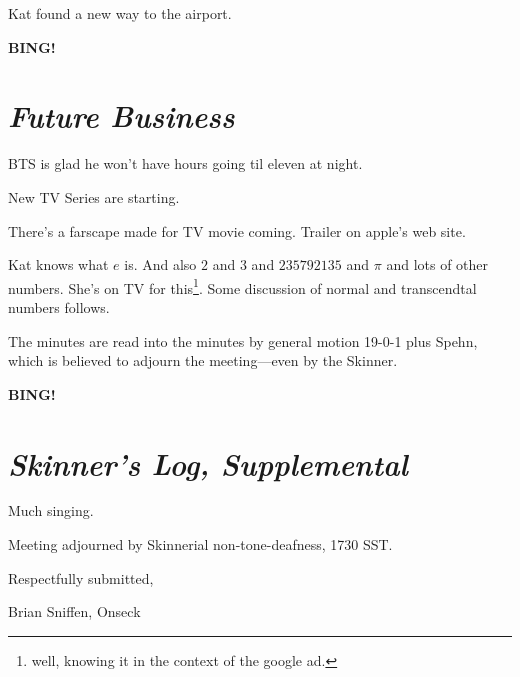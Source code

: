 \documentclass[10pt]{article}
\newcommand{\bing}{{\bf BING!} }
\newcommand{\goto}[1]{\bing \vskip 12pt \section*{{\em{#1}}}}
\newcommand{\ps}{ plus Spehn\xspace}
\begin{document}
Kat found a new way to the airport.

\goto{Future Business}

BTS is glad he won't have hours going til eleven at night.

New TV Series are starting.

There's a farscape made for TV movie coming.  Trailer on apple's web
site.

Kat knows what $e$ is.  And also $2$ and $3$ and $235792135$ and $\pi$
and lots of other numbers.  She's on TV for this\footnote{well,
  knowing it in the context of the google ad.}.  Some discussion of
normal and transcendtal numbers follows.

\vspace{12pt}

\noindent The minutes are read into the minutes by general motion 19-0-1\ps,
which is believed to adjourn the meeting---even by the Skinner.

\goto{Skinner's Log, Supplemental}

Much singing.

\vspace{12pt}

\noindent
Meeting adjourned by Skinnerial non-tone-deafness, 1730 SST.


\vspace{18pt}

\centerline{Respectfully submitted,}
\centerline{Brian Sniffen, Onseck}
\end{document}

